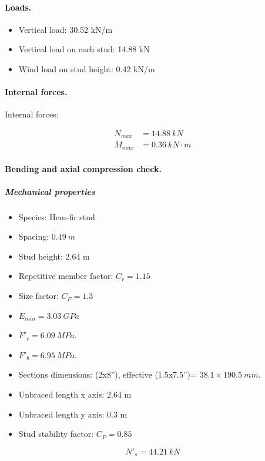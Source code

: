 \paragraph{Loads.}

\begin{itemize}
\item Vertical load: 30.52 kN/m
\item Vertical load on each stud: 14.88 kN
\item Wind load on stud height: 0.42 kN/m
\end{itemize}

\paragraph{Internal forces.}

\noindent Internal forces:

\begin{align}
  N_{max}&= 14.88\ kN \\
  M_{max}&= 0.36\ kN \cdot m
\end{align}

\paragraph{Bending and axial compression check.}

\subparagraph{Mechanical properties}

\begin{itemize}
\item Species: Hem-fir stud
\item Spacing: $0.49\ m$
\item Stud height: 2.64 m
\item Repetitive member factor: $C_r= 1.15$
\item Size factor: $C_F= 1.3$
\item $E_{min}= 3.03\ GPa$
\item $F'_c= 6.09\ MPa$.
\item $F'_b= 6.95\ MPa$.
\item Sections dimensions: (2x8''), effective (1.5x7.5'')= $38.1 \times 190.5\ mm$.
\item Unbraced length x axis: 2.64 m
\item Unbraced length y axis: 0.3 m
\item Stud stability factor: $C_P= 0.85$
\end{itemize}

\begin{equation}
  N'_s= 44.21\ kN
\end{equation}

